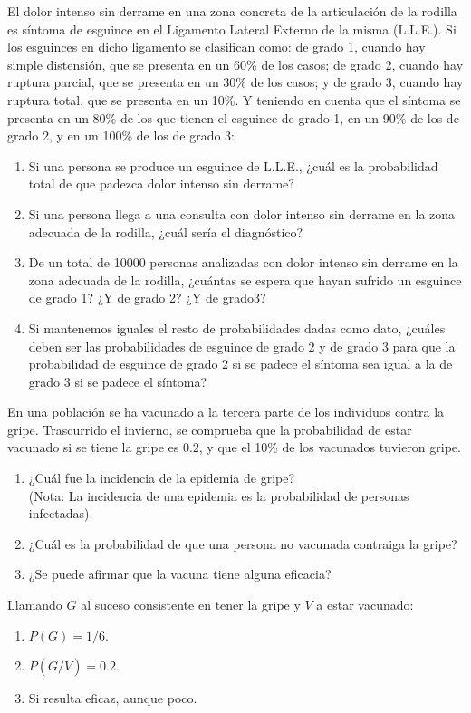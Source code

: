 {El dolor intenso sin derrame en una zona concreta de la articulación de la rodilla es síntoma de esguince en el Ligamento Lateral Externo
de la misma (L.L.E.). Si los esguinces en dicho ligamento se clasifican como: de grado 1, cuando hay simple distensión, que se presenta en
un 60\% de los casos; de grado 2, cuando hay ruptura parcial, que se presenta en un 30\% de los casos; y de grado 3, cuando hay ruptura
total, que se presenta en un 10\%. Y teniendo en cuenta que el síntoma se presenta en un 80\% de los que tienen el esguince de grado 1, en
un 90\% de los de grado 2, y en un 100\% de los de grado 3:
\begin{enumerate}
\item Si una persona se produce un esguince de L.L.E., ¿cuál es la probabilidad total de que padezca dolor intenso sin
derrame?
\item Si una persona llega a una consulta con dolor intenso sin derrame en la zona adecuada de la rodilla, ¿cuál sería
el diagnóstico?
\item De un total de 10000 personas analizadas con dolor intenso sin derrame en la zona adecuada de la rodilla,
¿cuántas se espera que hayan sufrido un esguince de grado 1?
¿Y de grado 2?
¿Y de grado3?
\item Si mantenemos iguales el resto de probabilidades dadas como dato, ¿cuáles deben ser las probabilidades de
esguince de grado 2 y de grado 3 para que la probabilidad de esguince de grado 2 si se padece el síntoma sea igual a la
de grado 3 si se padece el síntoma?
\end{enumerate}
}
{}
{}


{En una población se ha vacunado a la tercera parte de los individuos contra la gripe.
Trascurrido el invierno, se comprueba que la probabilidad de estar vacunado si se tiene la gripe es $0.2$, y que el
10\% de los vacunados tuvieron gripe.
\begin{enumerate}
\item ¿Cuál fue la incidencia de la epidemia de gripe?\\
(Nota: La incidencia de una epidemia es la probabilidad de
personas infectadas).
\item ¿Cuál es la probabilidad de que una persona no vacunada contraiga la gripe?
\item ¿Se puede afirmar que la vacuna tiene alguna eficacia?
\end{enumerate}
}
{Llamando $G$ al suceso consistente en tener la gripe y $V$ a estar vacunado:
\begin{enumerate}
\item $P(G)=1/6$.
\item $P(G/\overline{V})=0.2$.
\item Si resulta eficaz, aunque poco.
\end{enumerate}
}
{}


